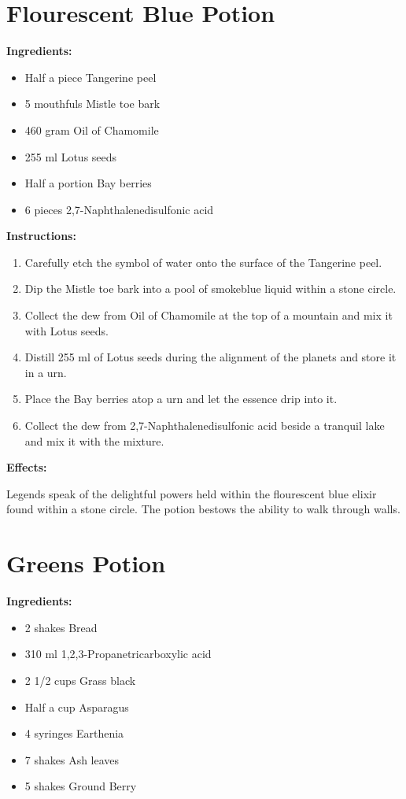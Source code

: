 \documentclass{article}
\begin{document}
\section*{Flourescent Blue Potion}

\textbf{Ingredients:}

\begin{itemize}
  \item Half a piece Tangerine peel
  \item 5 mouthfuls Mistle toe bark
  \item 460 gram Oil of Chamomile
  \item 255 ml Lotus seeds
  \item Half a portion Bay berries
  \item 6 pieces 2,7-Naphthalenedisulfonic acid
\end{itemize}

\textbf{Instructions:}

\begin{enumerate}
  \item Carefully etch the symbol of water onto the surface of the Tangerine peel.
  \item Dip the Mistle toe bark into a pool of smokeblue liquid within a stone circle.
  \item Collect the dew from Oil of Chamomile at the top of a mountain and mix it with Lotus seeds.
  \item Distill 255 ml of Lotus seeds during the alignment of the planets and store it in a urn.
  \item Place the Bay berries atop a urn and let the essence drip into it.
  \item Collect the dew from 2,7-Naphthalenedisulfonic acid beside a tranquil lake and mix it with the mixture.
\end{enumerate}

\textbf{Effects:}

Legends speak of the delightful powers held within the flourescent blue elixir found within a stone circle. The potion bestows the ability to walk through walls.

\newpage
\section*{Greens Potion}

\textbf{Ingredients:}

\begin{itemize}
  \item 2 shakes Bread
  \item 310 ml 1,2,3-Propanetricarboxylic acid
  \item 2 1/2 cups Grass black
  \item Half a cup Asparagus
  \item 4 syringes Earthenia
  \item 7 shakes Ash leaves
  \item 5 shakes Ground Berry
\end{itemize}
\end{document}
